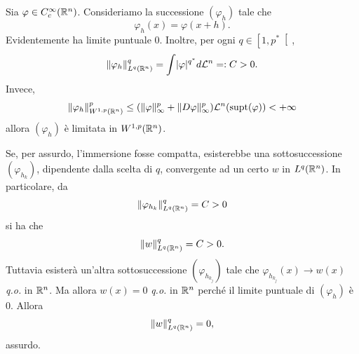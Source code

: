 \begin{esempio}
	Sia $\varphi \in C^\infty_c(\mathbb{R}^n)$. Consideriamo la successione $(\varphi_h)$ tale che
	\[ \varphi_h (x) = \varphi(x+h).  \]
	Evidentemente ha limite puntuale $0$. Inoltre, per ogni $q \in \left[ 1,p^\ast\right[$, 
	\[ \lVert\varphi_h\rVert_{L^{q}(\mathbb{R}^n)}^{q} = \int \lvert\varphi\rvert^{q^\ast}d\mathcal{L}^n =: C > 0. \]
	Invece,
	\begin{align*}
		\lVert\varphi_h\rVert_{W^{1,p}(\mathbb{R}^n)}^{p} \le (\lVert\varphi\rVert_\infty^p + \lVert D\varphi\rVert_\infty^p) \mathcal{L}^n(\textup{supt}(\varphi)) <+\infty
	\end{align*}
	allora $(\varphi_h)$ è limitata in $W^{1,p}(\mathbb{R}^n)$. 
	
	Se, per assurdo, l'immersione fosse compatta, esisterebbe una sottosuccessione $(\varphi_{h_k})$, dipendente dalla scelta di $q$, convergente ad un certo $w$ in $L^{q}(\mathbb{R}^n)$. 
	In particolare, da
	\[ \lVert\varphi_{h_k}\rVert_{L^{q}(\mathbb{R}^n)}^{q} = C > 0 \]
	si ha che 
	\[ \lVert w\rVert_{L^{q}(\mathbb{R}^n)}^{q} = C > 0. \]
	Tuttavia esisterà un'altra sottosuccessione $(\varphi_{h_{k_j}})$ tale che $\varphi_{h_{k_j}}(x) \to w(x)$ \emph{q.o.} in $\mathbb{R}^n$. Ma allora $w(x) = 0$ \emph{q.o.} in $\mathbb{R}^n$ perché il limite puntuale di $(\varphi_h)$ è $0$. Allora
	\[ \lVert w\rVert_{L^{q}(\mathbb{R}^n)}^{q} = 0, \]
	assurdo.
\end{esempio}

